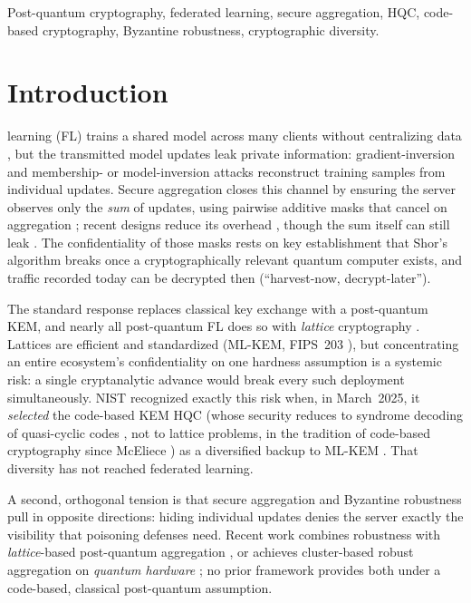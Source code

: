 \documentclass[lettersize,journal]{IEEEtran}
\begin{document}
\begin{IEEEkeywords}
Post-quantum cryptography, federated learning, secure aggregation, HQC, code-based
cryptography, Byzantine robustness, cryptographic diversity.
\end{IEEEkeywords}

\section{Introduction}
 learning (FL) trains a shared model across many clients without
centralizing data \cite{mcmahan2017,kairouz2021}, but the transmitted model updates leak private information:
gradient-inversion \cite{zhu2019,geiping2020} and membership- or model-inversion
\cite{shokri2017,fredrikson2015} attacks reconstruct training samples from
individual updates. Secure aggregation closes this channel by ensuring the server
observes only the \emph{sum} of updates, using pairwise additive masks that cancel on
aggregation \cite{bonawitz2017,bell2020}; recent designs reduce its overhead
\cite{lightsecagg,swiftagg}, though the sum itself can still leak
\cite{elkordy2022}. The confidentiality of those masks rests on key
establishment that Shor's algorithm \cite{shor1997} breaks once a cryptographically relevant quantum
computer exists, and traffic recorded today can be decrypted then
(``harvest-now, decrypt-later'').

The standard response replaces classical key exchange with a post-quantum KEM, and
nearly all post-quantum FL does so with \emph{lattice} cryptography
\cite{pqsf2024,qinxu2025,narsimhulu2026,nguyen2025lattice,byzpqfl2026}. Lattices are
efficient and standardized (ML-KEM, FIPS~203 \cite{fips203}), but concentrating an
entire ecosystem's confidentiality on one hardness assumption is a systemic risk: a
single cryptanalytic advance would break every such deployment simultaneously. NIST
recognized exactly this risk when, in March~2025, it \emph{selected} the code-based
KEM HQC (whose security reduces to syndrome decoding of quasi-cyclic codes
\cite{macwilliams1977}, not to lattice problems, in the tradition of code-based
cryptography since McEliece \cite{mceliece1978}) as a diversified backup to ML-KEM
\cite{nistir8545}. That diversity has not reached federated learning.

A second, orthogonal tension is that secure aggregation and Byzantine robustness pull
in opposite directions: hiding individual updates denies the server exactly the
visibility that poisoning defenses need. Recent work combines robustness with
\emph{lattice}-based post-quantum aggregation \cite{byzpqfl2026}, or achieves
cluster-based robust aggregation on \emph{quantum hardware} \cite{cqsa2026}; no prior
framework provides both under a code-based, classical post-quantum assumption.
\end{document}
